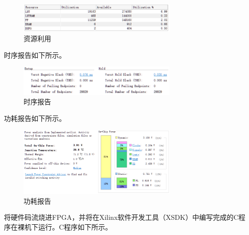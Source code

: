 \documentclass[12pt]{article}
\begin{document}
\begin{figure}[H]
\begin{center}
\includegraphics[width=0.7\textwidth]{./highperformance/Utilization.png}
\caption{资源利用}
\label{Utilization}
\end{center}
\end{figure}
时序报告如下所示。
\begin{figure}[H]
\begin{center}
\includegraphics[width=0.7\textwidth]{./highperformance/Timing.png}
\caption{时序报告}
\label{Timing}
\end{center}
\end{figure}
功耗报告如下所示。
\begin{figure}[H]
\begin{center}
\includegraphics[width=0.7\textwidth]{./highperformance/Power.png}
\caption{功耗报告}
\label{Power}
\end{center}
\end{figure}
将硬件码流烧进FPGA，并将在Xilinx软件开发工具（XSDK）中编写完成的C程序在裸机下运行。C程序如下所示。
\end{document}
